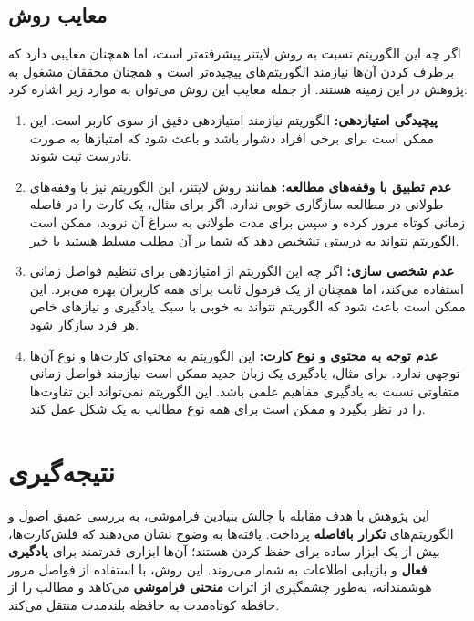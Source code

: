 \documentclass[12pt]{report}
\begin{document}
\section{معایب روش }
اگر چه این الگوریتم نسبت به روش لایتنر پیشرفته‌تر است، اما همچنان معایبی دارد که برطرف کردن آن‌ها نیازمند
الگوریتم‌های پیچیده‌تر است و همچنان محققان مشغول به پژوهش در این زمینه هستند.
از جمله معایب این روش می‌توان به موارد زیر اشاره کرد:

\begin{enumerate}
    \item \textbf{پیچیدگی امتیازدهی:} الگوریتم  نیازمند امتیازدهی دقیق از سوی کاربر است. این ممکن است برای برخی افراد دشوار باشد و باعث شود که امتیازها به صورت نادرست ثبت شوند.
    \item \textbf{عدم تطبیق با وقفه‌های مطالعه:} همانند روش لایتنر، این الگوریتم نیز با وقفه‌های طولانی در مطالعه سازگاری خوبی ندارد. اگر برای مثال، یک کارت را در فاصله زمانی کوتاه مرور کرده و سپس برای مدت طولانی به سراغ آن نروید، ممکن است الگوریتم نتواند به درستی تشخیص دهد که شما بر آن مطلب مسلط هستید یا خیر.
    \item \textbf{عدم شخصی سازی:} اگر چه این الگوریتم از امتیازدهی برای تنظیم فواصل زمانی استفاده می‌کند، اما همچنان از یک فرمول ثابت برای همه کاربران بهره می‌برد. این ممکن است باعث شود که الگوریتم نتواند به خوبی با سبک یادگیری و نیازهای خاص هر فرد سازگار شود.
    \item \textbf{عدم توجه به محتوی و نوع کارت:} این الگوریتم به محتوای کارت‌ها و نوع آن‌ها توجهی ندارد. برای مثال، یادگیری یک زبان جدید ممکن است نیازمند فواصل زمانی متفاوتی نسبت به یادگیری مفاهیم علمی باشد. این الگوریتم نمی‌تواند این تفاوت‌ها را در نظر بگیرد و ممکن است برای همه نوع مطالب به یک شکل عمل کند.
\end{enumerate}


\chapter*{نتیجه‌گیری}

این پژوهش با هدف مقابله با چالش بنیادین فراموشی، به بررسی عمیق اصول و الگوریتم‌های \textbf{تکرار بافاصله} پرداخت. یافته‌ها به وضوح نشان می‌دهند که فلش‌کارت‌ها، بیش از یک ابزار ساده برای حفظ کردن هستند؛ آن‌ها ابزاری قدرتمند برای \textbf{یادگیری فعال} و بازیابی اطلاعات به شمار می‌روند. این روش، با استفاده از فواصل مرور هوشمندانه، به‌طور چشمگیری از اثرات \textbf{منحنی فراموشی} می‌کاهد و مطالب را از حافظه کوتاه‌مدت به حافظه بلندمدت منتقل می‌کند.
\end{document}
